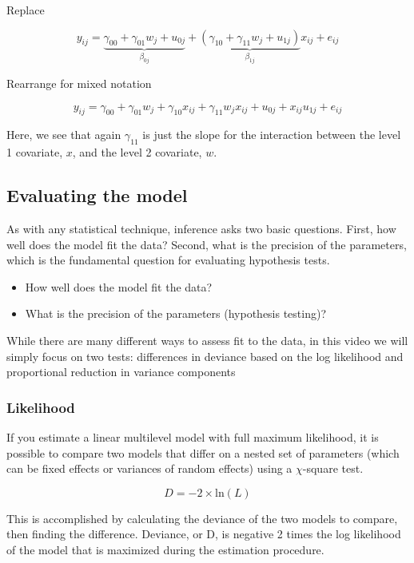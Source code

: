 Replace

\[
y_{ij} = \underbrace{\gamma_{00}+\gamma_{01}w_j+u_{0j}}_{\beta_{0j}}+\underbrace{\left(\gamma_{10}+\gamma_{11}w_j+u_{1j}\right)}_{\beta_{1j}}x_{ij}+e_{ij}
\]

Rearrange for mixed notation

\[
y_{ij} = \gamma_{00} + \gamma_{01}w_j + \gamma_{10}x_{ij}+\gamma_{11}w_jx_{ij}+u_{0j}+x_{ij}u_{1j}+e_{ij}
\]

Here, we see that again $\gamma_{11}$ is just the slope for the interaction between the level 1 covariate, $x$, and the level 2 covariate, $w$.

\subsection{Evaluating the model}

As with any statistical technique, inference asks two basic questions. First, how well does the model fit the data? Second, what is the precision of the parameters, which is the fundamental question for evaluating hypothesis tests.

\begin{itemize}
	\item How well does the model fit the data?
	\item What is the precision of the parameters (hypothesis testing)?
\end{itemize}

While there are many different ways to assess fit to the data, in this video we will simply focus on two tests: differences in deviance based on the log likelihood and proportional reduction in variance components

\subsubsection{Likelihood}

If you estimate a linear multilevel model with full maximum likelihood, it is possible to compare two models that differ on a nested set of parameters (which can be fixed effects or variances of random effects) using a $\chi$-square test.

\[
D = -2\times \mbox{ln}\left(L\right)
\]

This is accomplished by calculating the deviance of the two models to compare, then finding the difference. Deviance, or D, is negative 2 times the log likelihood of the model that is maximized during the estimation procedure.

